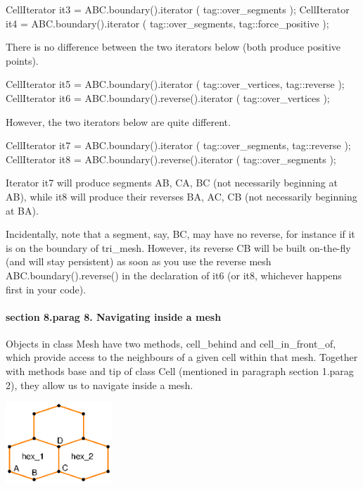 \verbatim
   CellIterator it3 = ABC.boundary().iterator ( tag::over_segments );
   CellIterator it4 =
      ABC.boundary().iterator ( tag::over_segments, tag::force_positive );
\endverbatim

There is no difference between the two iterators below (both produce positive
points).

\verbatim
   CellIterator it5 = ABC.boundary().iterator ( tag::over_vertices, tag::reverse );
   CellIterator it6 = ABC.boundary().reverse().iterator ( tag::over_vertices );
\endverbatim

However, the two iterators below are quite different.

\verbatim
   CellIterator it7 = ABC.boundary().iterator ( tag::over_segments, tag::reverse );
   CellIterator it8 = ABC.boundary().reverse().iterator ( tag::over_segments );
\endverbatim

Iterator {\codett it7} will produce segments {\codett AB}, {\codett CA}, {\codett BC}
(not necessarily beginning at {\codett AB}), while {\codett it8} will produce their reverses
{\codett BA}, {\codett AC}, {\codett CB} (not necessarily beginning at {\codett BA}).

Incidentally, note that a segment, say, {\codett BC}, may have no reverse,
for instance if it is on the boundary of {\codett tri\_mesh}.
However, its reverse {\codett CB} will be built on-the-fly (and will stay persistent)
as soon as you use the reverse mesh {\codett ABC.boundary().reverse()} in the declaration of
{\codett it6} (or {\codett it8}, whichever happens first in your code).


\paragraph{\numb section 8.\numb parag 8. Navigating inside a mesh}

Objects in class {\codett Mesh} have two methods, {\codett cell\_behind} and
{\codett cell\_in\_front\_of},
which provide access to the neighbours of a given cell within that mesh.
Together with methods {\codett base} and {\codett tip} of class {\codett Cell}
(mentioned in paragraph \numb section 1.\numb parag 2), they allow us to navigate inside
a mesh.

{ 
\centerline{\includegraphics[width=4cm]{malha-hex.eps}} }
\medskip

